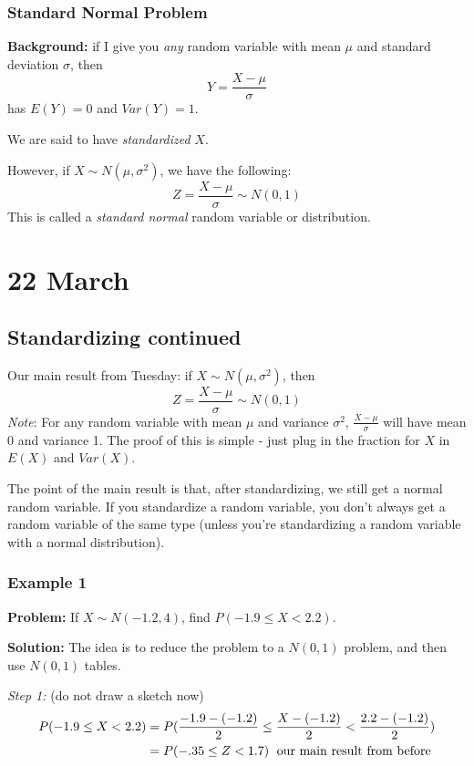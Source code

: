\documentclass[12pt]{article}
\begin{document}
\subsubsection{Standard Normal Problem}
\textbf{Background:} if I give you \emph{any} random variable with mean $\mu$ and standard deviation $\sigma$, then 
\[
    Y = \frac{X - \mu}{\sigma}
\]
has $E(Y) = 0$ and $Var(Y) = 1$. 

We are said to have \emph{standardized} $X$.

However, if $X \sim N(\mu, \sigma^2)$, we have the following:
\[
    Z = \frac{X - \mu}{\sigma} \sim N(0,1)
\]
This is called a \emph{standard normal} random variable or distribution. 

\section{22 March}
\subsection{Standardizing continued}
Our main result from Tuesday: if $X \sim N(\mu, \sigma^2)$, then
\[
    Z = \frac{X - \mu}{\sigma} \sim N(0,1)
\]
\emph{Note}: For any random variable with mean $\mu$ and variance $\sigma^2$, $\frac{X-\mu}{\sigma}$ will have mean 0 and variance 1. The proof of this is simple - just plug in the fraction for $X$ in $E(X)$ and $Var(X)$.

The point of the main result is that, after standardizing, we still get a normal random variable. If you standardize a random variable, you don't always get a random variable of the same type (unless you're standardizing a random variable with a normal distribution).

\subsubsection{Example 1}
\textbf{Problem:} If $X \sim N(-1.2, 4)$, find $P(-1.9 \leq X < 2.2)$.

\textbf{Solution:} The idea is to reduce the problem to a $N(0,1)$ problem, and then use $N(0,1)$ tables. 

\emph{Step 1:} (do not draw a sketch now)
\begin{align*}
    P(-1.9 \leq X < 2.2) &= P( \frac{-1.9-(-1.2)}{2} \leq \frac{X - (-1.2)}{2} < \frac{2.2-(-1.2)}{2}) \\
        &=  P(-.35 \leq Z < 1.7) \; \textnormal{ our main result from before }
\end{align*}
\end{document}
